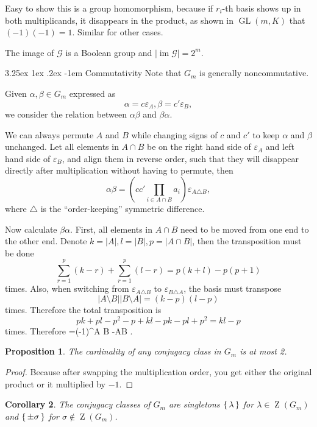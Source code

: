 \documentclass[12pt, letterpaper]{article}
\makeatletter
\newcommand{\GL}{\operatorname{GL}}
\newcommand{\ZZ}{\operatorname{Z}}
\newcommand{\card}[1]{\left\lvert #1 \right\rvert}
\newcommand{\symdif}{\triangle}
\newenvironment{eqlong}{\equation\aligned}{\endaligned\endequation}
\newtheorem{prop}{Proposition}[section]
\newtheorem{cor}[prop]{Corollary}
\renewcommand\paragraph{\@startsection{paragraph}{4}{\z@}%
	{3.25ex \@plus1ex \@minus.2ex}%
	{-1em}%
	{\normalfont\normalsize\bfseries}}
\theoremstyle{definition}
\theoremstyle{remark}
\theoremstyle{definition}
\theoremstyle{plain}
\numberwithin{equation}{section}
\makeatother
\begin{document}
	Easy to show this is a group homomorphism, because if $r_i$-th basis shows up in both multiplicands,
	it disappears in the product, as shown in $\GL(m,K)$ that $(-1)(-1)=1$. Similar for other cases.
	
	The image of $\mathcal{G}$ is a Boolean group and $\card{\operatorname{im}\mathcal{G}}=2^m$.
	
	\paragraph{Commutativity}
	Note that $G_m$ is generally noncommutative.
	
	Given $\alpha, \beta \in G_m$ expressed as
	\[\alpha=c\varepsilon_A, \beta=c'\varepsilon_B,\]
	we consider the relation between $\alpha\beta$ and $\beta\alpha$.
	
	We can always permute $A$ and $B$ while changing signs of $c$ and $c'$ to keep $\alpha$ and $\beta$ unchanged.
	Let all elements in $A\cap B$ be on the right hand side of $\varepsilon_A$ and left hand side of $\varepsilon_B$,
	and align them in reverse order, such that they will disappear directly after multiplication without having to permute,
	then 
	\[\alpha\beta = \left( cc'\prod_{i\in A\cap B}a_i\right) \varepsilon_{A\symdif B},\]
	where $\symdif$ is the ``order-keeping'' symmetric difference.
	
	Now calculate $\beta\alpha$. First, all elements in $A\cap B$ need to be moved from one end to the other end.
	Denote $k=\card{A},l=\card{B},p=\card{A\cap B}$, then the transposition must be done
	\[ \sum_{r=1}^{p}(k-r)+\sum_{r=1}^{p}(l-r) =p(k+l)-p(p+1)\]
	times. Also, when switching from $\varepsilon_{A\symdif B}$ to $\varepsilon_{B\symdif A}$,
	the basis must transpose
	\[\card{A\setminus B}\card{B\setminus A}=(k-p)(l-p)\]
	times.
	Therefore the total transposition is
	\[ pk+pl -p^2-p+kl-pk-pl+p^2=kl-p\]
	times.
	Therefore
	\begin{eqlong}\label{eqCommutGm}
		\beta\alpha=(-1)^{\card{A}\card{B}-\card{A\cap B}}\alpha \beta.
	\end{eqlong}
	
	
	\begin{prop}
		The cardinality of any conjugacy class in $G_m$ is at most 2.
	\end{prop}
	\begin{proof}
		Because after swapping the multiplication order, you get either the original product or it multiplied by $-1$.
	\end{proof}
	\begin{cor}
		The conjugacy classes of $G_m$ are singletons $\set{\lambda}$ for $\lambda\in \ZZ(G_m)$
		and $\set{\pm\sigma}$ for $\sigma\notin \ZZ(G_m)$.
	\end{cor}
	
\end{document}
